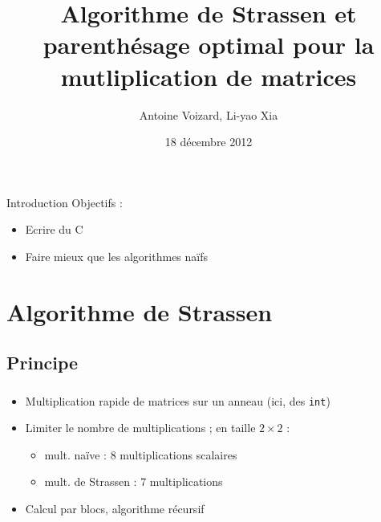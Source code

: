 \documentclass{beamer}
\title[Projet de programmation et d'algorithmique]{
Algorithme de Strassen et parenthésage optimal
pour la mutliplication de matrices}
\author{Antoine Voizard, Li-yao Xia}
\date{18 décembre 2012}
\begin{document}
\begin{frame}
\titlepage
\end{frame}


\begin{frame}{Introduction}
  Objectifs :
  \begin{itemize}
    \item Ecrire du C
    \item Faire mieux que les algorithmes naïfs
  \end{itemize}
\end{frame}

\section{Algorithme de Strassen}

\subsection{Principe}
\begin{frame}[fragile]
  \frametitle{\insertsubsection}
  \begin{itemize}
    \item Multiplication rapide de matrices sur un anneau
    (ici, des \verb=int=)
    \item Limiter le nombre de multiplications ; en taille $2 \times 2$ :
    \begin{itemize}
      \item mult. naïve : 8 multiplications scalaires
      \item mult. de Strassen : 7 multiplications
    \end{itemize}
    \item Calcul par blocs, algorithme récursif
  \end{itemize}
\end{frame}
\end{document}
